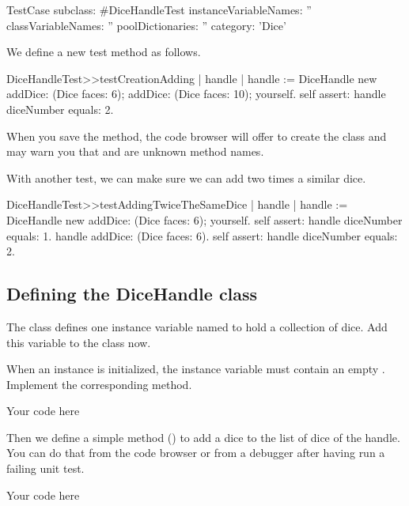\documentclass[a4paper,10pt,twoside]{book}
\begin{document}
\begin{code}{}
TestCase subclass: #DiceHandleTest
    instanceVariableNames: ''
    classVariableNames: ''
    poolDictionaries: ''
    category: 'Dice'
\end{code}


We define a new test method as follows.


\begin{code}{}
DiceHandleTest>>testCreationAdding
    | handle |
    handle := DiceHandle new
        addDice: (Dice faces: 6);
        addDice: (Dice faces: 10);
        yourself.
    self assert: handle diceNumber equals: 2.
\end{code}


When you save the method, the code browser will offer to create the class and may warn you that  and  are unknown method names.

With another test, we can make sure we can add two times a similar dice.


\begin{code}{}
DiceHandleTest>>testAddingTwiceTheSameDice
    | handle |
    handle := DiceHandle new
        addDice: (Dice faces: 6);
        yourself.
    self assert: handle diceNumber equals: 1.
    handle addDice: (Dice faces: 6).
    self assert: handle diceNumber equals: 2.
\end{code}

\subsection{ Defining the DiceHandle class}
The  class defines one instance variable named  to hold a collection of dice. Add this variable to the class now.

When an instance is initialized, the instance variable  must contain an empty . Implement the corresponding  method.


\begin{code}{}
Your code here
\end{code}


Then we define a simple method () to add a dice to the list of dice of the handle. You can do that from the code browser or from a debugger after having run a failing unit test.


\begin{code}{}
Your code here
\end{code}
\end{document}
